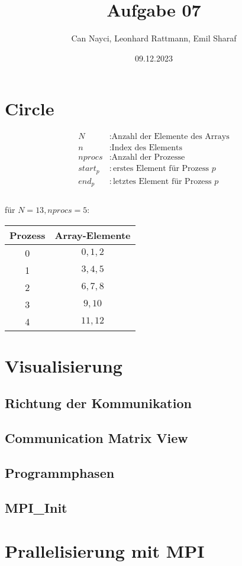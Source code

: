 \documentclass[a4paper,10pt]{article}
\title{Aufgabe 07}
\author{Can Nayci, Leonhard Rattmann, Emil Sharaf}
\date{09.12.2023}
\begin{document}
\maketitle

\section{Circle}
\begin{align*}
 N &: \text{Anzahl der Elemente des Arrays} \\
 n &: \text{Index des Elements} \\
 nprocs &: \text{Anzahl der Prozesse} \\
 start_p &: \text{erstes Element für Prozess } p\\
 end_p &: \text{letztes Element für Prozess } p\\
\end{align*}\\
für $N = 13, nprocs = 5$:
\begin{tabular}{c | c}
 Prozess & Array-Elemente \\
 \hline
 0 & $0,1,2$\\
 1 & $3,4,5$\\
 2 & $6,7,8$\\
 3 & $9,10$\\
 4 & $11,12$\\
\end{tabular}

\section{Visualisierung}
\subsection{Richtung der Kommunikation}
\subsection{Communication Matrix View}
\subsection{Programmphasen}
\subsection{MPI\_Init}
\section{Prallelisierung mit MPI}
\end{document}

